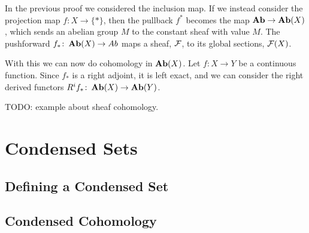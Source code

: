 \documentclass{article}
\begin{document}
In the previous proof we considered the inclusion map.
If we instead consider the projection map $f\colon X \to \{*\}$,
then the pullback $f^*$ becomes the map $\operatorname{\mathbf{Ab}} \to \operatorname{\mathbf{Ab}}(X)$,
which sends an abelian group $M$ to the constant sheaf with
value $M$. The pushforward $f_*\colon \operatorname{\mathbf{Ab}}(X) \to Ab$ maps
a sheaf, $\mathcal{F}$, to its global sections, $\mathcal{F}(X)$.

With this we can now do cohomology in $\operatorname{\mathbf{Ab}}(X)$.
Let $f\colon X \to Y$ be a continuous function.
Since $f_*$ is a right adjoint, it is left exact, and
we can consider the right derived functors $R^if_* \colon \operatorname{\mathbf{Ab}}(X) \to \operatorname{\mathbf{Ab}}(Y)$.

TODO: example about sheaf cohomology.
\section{Condensed Sets}

\subsection{Defining a Condensed Set}

\subsection{Condensed Cohomology}



\end{document}
